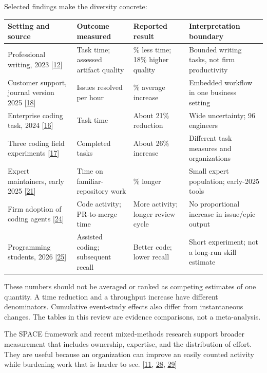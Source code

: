 Selected findings make the diversity concrete:



{\footnotesize\setlength{\tabcolsep}{3pt}\renewcommand{\arraystretch}{1.25}
\begin{longtable}{>{\raggedright\arraybackslash}p{}>{\raggedright\arraybackslash}p{}>{\raggedright\arraybackslash}p{}>{\raggedright\arraybackslash}p{}}\toprule
Setting and source & Outcome measured & Reported result & Interpretation boundary \\\midrule\endhead
Professional writing, 2023 [\hyperlink{ref-noy2023}{12}] & Task time; assessed artifact quality & 40\% less time; 18\% higher quality & Bounded writing tasks, not firm productivity \\
Customer support, journal version 2025 [\hyperlink{ref-brynjolfsson2025}{18}] & Issues resolved per hour & 15\% average increase & Embedded workflow in one business setting \\
Enterprise coding task, 2024 [\hyperlink{ref-paradis2024}{16}] & Task time & About 21\% reduction & Wide uncertainty; 96 engineers \\
Three coding field experiments [\hyperlink{ref-cui2025}{17}] & Completed tasks & About 26\% increase & Different task measures and organizations \\
Expert maintainers, early 2025 [\hyperlink{ref-metr2025}{21}] & Time on familiar-repository work & 19\% longer & Small expert population; early-2025 tools \\
Firm adoption of coding agents [\hyperlink{ref-chenstratton2026}{24}] & Code activity; PR-to-merge time & More activity; longer review cycle & No proportional increase in issue/epic output \\
Programming students, 2026 [\hyperlink{ref-bergh2026}{25}] & Assisted coding; subsequent recall & Better code; lower recall & Short experiment; not a long-run skill estimate \\
\bottomrule\end{longtable}}
These numbers should not be averaged or ranked as competing estimates of one quantity. A time reduction and a throughput increase have different denominators. Cumulative event-study effects also differ from instantaneous changes. The tables in this review are evidence comparisons, not a meta-analysis.


The SPACE framework and recent mixed-methods research support broader measurement that includes ownership, expertise, and the distribution of effort. They are useful because an organization can improve an easily counted activity while burdening work that is harder to see. [\hyperlink{ref-space2021}{11}, \hyperlink{ref-chen2026}{28}, \hyperlink{ref-afroz2025}{29}]




